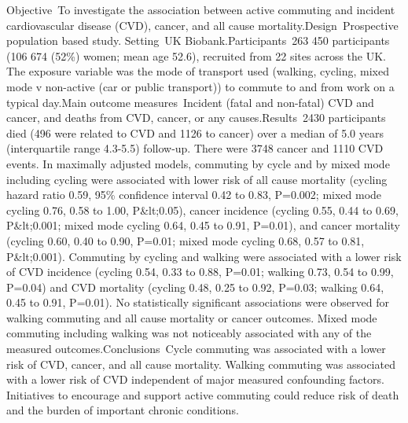 Objective~To investigate the association between active commuting and incident cardiovascular disease (CVD), cancer, and all cause mortality.Design~Prospective population based study. Setting~UK Biobank.Participants~263 450 participants (106 674 (52\%) women; mean age 52.6), recruited from 22 sites across the UK. The exposure variable was the mode of transport used (walking, cycling, mixed mode v non-active (car or public transport)) to commute to and from work on a typical day.Main outcome measures~Incident (fatal and non-fatal) CVD and cancer, and deaths from CVD, cancer, or any causes.Results~2430 participants died (496 were related to CVD and 1126 to cancer) over a median of 5.0 years (interquartile range 4.3-5.5) follow-up. There were 3748 cancer and 1110 CVD events. In maximally adjusted models, commuting by cycle and by mixed mode including cycling were associated with lower risk of all cause mortality (cycling hazard ratio 0.59, 95\% confidence interval 0.42 to 0.83, P=0.002; mixed mode cycling 0.76, 0.58 to 1.00, P\&lt;0.05), cancer incidence (cycling 0.55, 0.44 to 0.69, P\&lt;0.001; mixed mode cycling 0.64, 0.45 to 0.91, P=0.01), and cancer mortality (cycling 0.60, 0.40 to 0.90, P=0.01; mixed mode cycling 0.68, 0.57 to 0.81, P\&lt;0.001). Commuting by cycling and walking were associated with a lower risk of CVD incidence (cycling 0.54, 0.33 to 0.88, P=0.01; walking 0.73, 0.54 to 0.99, P=0.04) and CVD mortality (cycling 0.48, 0.25 to 0.92, P=0.03; walking 0.64, 0.45 to 0.91, P=0.01). No statistically significant associations were observed for walking commuting and all cause mortality or cancer outcomes. Mixed mode commuting including walking was not noticeably associated with any of the measured outcomes.Conclusions~Cycle commuting was associated with a lower risk of CVD, cancer, and all cause mortality. Walking commuting was associated with a lower risk of CVD independent of major measured confounding factors. Initiatives to encourage and support active commuting could reduce risk of death and the burden of important chronic conditions.